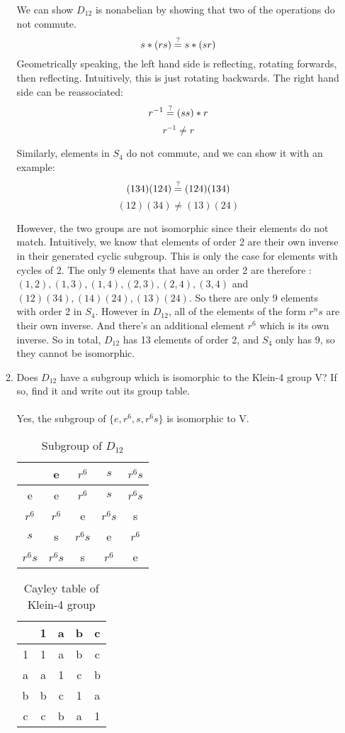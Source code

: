 \begin{enumerate}
\begin{enumerate}
  We can show $D_{12}$ is nonabelian by showing that two of the operations do not commute.
  $$s * (rs) \stackrel{?}{=} s * (sr)$$
  Geometrically speaking, the left hand side is reflecting, rotating forwards, then reflecting. Intuitively, this is just rotating backwards. The right hand side can be reassociated:
  $$r^{-1} \stackrel{?}{=} (ss)*r$$
  $$r^{-1} \neq r$$

  Similarly, elements in $S_4$ do not commute, and we can show it with an example:
  $$(134)(124) \stackrel{?}{=} (124)(134)$$
  $$(12)(34) \neq (13)(24)$$

  However, the two groups are not isomorphic since their elements do not match. Intuitively, we know that elements of order 2 are their own inverse in their generated cyclic subgroup. This is only the case for elements with cycles of 2. The only 9 elements that have an order 2 are therefore : $(1,2), (1,3), (1,4), (2,3), (2,4), (3,4)$ and $(12)(34), (14)(24), (13)(24)$. So there are only 9 elements with order 2 in $S_4$. However in $D_{12}$, all of the elements of the form $r^ns$ are their own inverse. And there's an additional element $r^6$ which is its own inverse. So in total, $D_{12}$ has 13 elements of order 2, and $S_4$ only has 9, so they cannot be isomorphic.

  \item Does $D_{12}$ have a subgroup which is isomorphic to the Klein-4 group V? If so, find it and write out its group table.\\\\

  Yes, the subgroup of $\{e, r^6, s, r^6s\}$ is isomorphic to V.

  \begin{table}[h!]
  \centering
  \begin{tabular}{|c |c |c |c| c|} 
   \hline
     & e & $r^6$ & $s$ & $r^6s$ \\ [0.5ex] 
   \hline
   e & e & $r^6$ & $s$ & $r^6s$ \\ 
   $r^6$ & $r^6$ & e & $r^6s$ & s \\
   $s$ & s & $r^6s$ & e & $r^6$ \\
   $r^6s$ & $r^6s$ & s & $r^6$ & e\\
   \hline
  \end{tabular}
  \caption{Subgroup of $D_{12}$}
  \end{table}

  \begin{table}[h!]
  \centering
  \begin{tabular}{|c |c |c |c| c|} 
   \hline
     & 1 & a & b & c \\ [0.5ex] 
   \hline
   1 & 1 & a & b & c \\ 
   a & a & 1 & c & b \\
   b & b & c & 1 & a \\
   c & c & b & a & 1\\
   \hline
  \end{tabular}
  \caption{Cayley table of Klein-4 group}
  \end{table}


\end{enumerate}
\end{enumerate}
